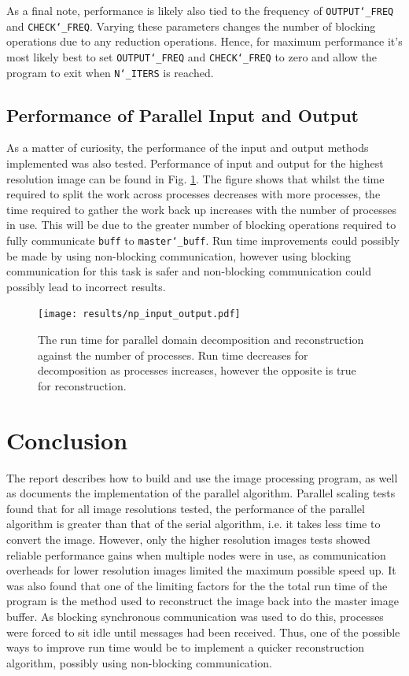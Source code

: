 \documentclass[11pt, a4paper]{article}
\begin{document}
			As a final note, performance is likely also tied to the frequency of \texttt{OUTPUT\char`_FREQ} and \texttt{CHECK\char`_FREQ}. Varying these parameters changes the number of blocking operations due to any reduction operations. Hence, for maximum performance it's most likely best to set \texttt{OUTPUT\char`_FREQ} and \texttt{CHECK\char`_FREQ} to zero and allow the program to exit when \texttt{N\char`_ITERS} is reached.
		
		\subsection{Performance of Parallel Input and Output}
			As a matter of curiosity, the performance of the input and output methods implemented was also tested. Performance of input and output for the highest resolution image can be found in Fig. \ref{fig:input_output}. The figure shows that whilst the time required to split the work across processes decreases with more processes, the time required to gather the work back up increases with the number of processes in use. This will be due to the greater number of blocking operations required to fully communicate \texttt{buff} to \texttt{master\char`_buff}. Run time improvements could possibly be made by using non-blocking communication, however using blocking communication for this task is safer and non-blocking communication could possibly lead to incorrect results. 
			
			\begin{figure}
				\centering
				\texttt{[image: results/np\_input\_output.pdf]}
				\caption{The run time for parallel domain decomposition and reconstruction against the number of processes. Run time decreases for decomposition as processes increases, however the opposite is true for reconstruction.}
				\label{fig:input_output}
			\end{figure}

	\section{Conclusion}
		The report describes how to build and use the image processing program, as well as documents the implementation of the parallel algorithm. Parallel scaling tests found that for all image resolutions tested, the performance of the parallel algorithm is greater than that of the serial algorithm, i.e. it takes less time to convert the image. However, only the higher resolution images tests showed reliable performance gains when multiple nodes were in use, as communication overheads for lower resolution images limited the maximum possible speed up. It was also found that one of the limiting factors for the the total run time of the program is the method used to reconstruct the image back into the master image buffer. As blocking synchronous communication was used to do this, processes were forced to sit idle until messages had been received. Thus, one of the possible ways to improve run time would be to implement a quicker reconstruction algorithm, possibly using non-blocking communication.
		
\end{document}
